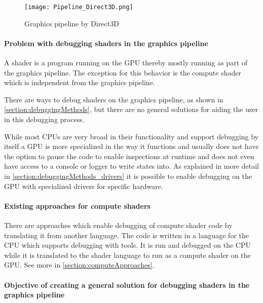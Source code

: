 \begin{figure}[h!]
  \centering 
  \texttt{[image: Pipeline\_Direct3D.png]}
  \caption[Graphics pipeline by Direct3D ]{Graphics pipeline by Direct3D}
  \label{fig:pipeline_direct3d}
\end{figure}

\paragraph{Problem with debugging shaders in the graphics pipeline}
\label{section:problems}

A shader is a program running on the GPU thereby mostly running as part of the graphics pipeline. The exception for this behavior is the compute shader which is independent from the graphics pipeline.

There are ways to debug shaders on the graphics pipeline, as shown in \autoref{section:debuggingMethods}, but there are no general solutions for aiding the user in this debugging process.

While most CPUs are very broad in their functionality and support debugging by itself a GPU is more specialized in the way it functions and usually does not have the option to pause the code to enable inspections at runtime and does not even have access to a console or logger to write states into. As explained in more detail in \autoref{section:debuggingMethods_drivers} it is possible to enable debugging on the GPU with specialized drivers for specific hardware.

\paragraph{Existing approaches for compute shaders}

There are approaches which enable debugging of compute shader code by translating it from another language. The code is written in a language for the CPU which supports debugging with tools. It is run and debugged on the CPU while it is translated to the shader language to run as a compute shader on the GPU.
See more in \autoref{section:computeApproaches}.

\paragraph{Objective of creating a general solution for debugging shaders in the graphics pipeline}
\label{paragraph:objective}

